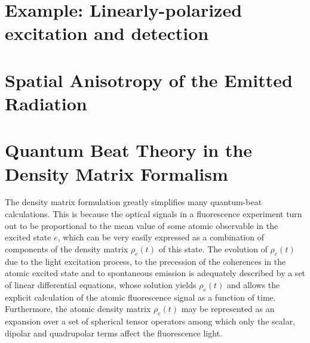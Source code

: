 \documentclass[11pt]{article}
\begin{document}
\section{Example: Linearly-polarized excitation and detection}



\section{Spatial Anisotropy of the Emitted Radiation}


























\appendix

\section{Quantum Beat Theory in the Density Matrix Formalism \cite{haroche}}\label{app:quantum_beats}



The density matrix formulation greatly simplifies many quantum-beat calculations. This is because the optical signals in a fluorescence experiment turn out to be proportional to the mean value of some atomic observable in the excited state $e$, which can be very easily expressed as a combination of components of the density matrix $\rho_e(t)$ of this state. The evolution of $\rho_e(t)$ due to the light excitation process, to the precession of the coherences
in the atomic excited state and to spontaneous emission is adequately described by a set of linear differential equations, whose solution yields $\rho_e(t)$ and allows the explicit calculation of the atomic fluorescence signal as a function of time. Furthermore, the atomic density matrix $\rho_e(t)$ may be represented as an expansion over a set of spherical tensor operators
among which only the scalar, dipolar and quadrupolar terms affect the fluorescence light.  
\end{document}
